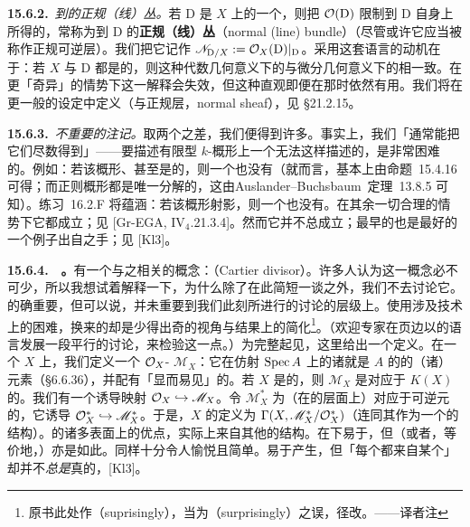 \textbf{15.6.2.}\ \emph{到\trEffectiveCartierDivisor{}的正规（线）丛。}\quad 若 $\mathrm{D}$ 是\trScheme{} $X$ 上的一个\trEffectiveCartierDivisor，则把\trInvertibleSheaf{} $\mathcal{O}(\mathrm{D})$ 限制到 $\mathrm{D}$ 自身上所得的\trRestriction，常称为到 $\mathrm{D}$ 的\textbf{正规（线）丛}（normal (line) bundle）（尽管或许它应当被称作正规可逆层）。我们把它记作 $\mathscr{N}_{\mathrm{D}/X}:=\mathcal{O}_X(\mathrm{D})\vert_{\mathrm{D}}$。采用这套语言的动机在于：若 $X$ 与 $\mathrm{D}$ 都是\trSmooth{}的\trComplex\trVariety，则这种代数几何意义下的\trNormalBundle{}与微分几何意义下的\trNormalBundle{}相一致。在更「奇异」的情势下这一解释会失效，但这种直观即便在那时依然有用。我们将在更一般的设定中定义\trNormalBundle{}（与正规层，normal sheaf），见 \S21.2.15。

\textbf{15.6.3.}\ \emph{不重要的注记。}\quad 取两个\trEffectiveCartierDivisor{}之差，我们便得到许多\trInvertibleSheaf。事实上，我们「通常能把它们尽数得到」——要描述有限型 $k$-概形上一个无法这样描述的\trInvertibleSheaf，是非常困难的。例如：若该概形\trRegular、甚至是\trFactorial{}的，则一个也没有（就\trFactoriality{}而言，基本上由\mbox{命题~15.4.16} 可得；而正则概形都是唯一分解的，这由\mbox{Auslander--Buchsbaum 定理~13.8.5} 可知）。\mbox{练习~16.2.F} 将蕴涵：若该概形射影，则一个也没有。在其余一切合理的情势下它都成立；见 [Gr-EGA, IV$_4$.21.3.4]。然而它并不总成立；最早的也是最好的一个例子出自\trKleiman{}之手；见 [Kl3]。

\textbf{15.6.4.}\ \extrahard\ \textbf{\trCartierDivisor。}\quad 有一个与之相关的概念：\emph{\trCartierDivisor}（Cartier divisor）。许多人认为这一概念必不可少，所以我想试着解释一下，为什么除了在此简短一谈之外，我们不去讨论它。\trCartierDivisor{}的确重要，但可以说，并未重要到我们此刻所进行的讨论的层级上。使用\trCartierDivisor{}涉及技术上的困难，换来的却是少得出奇的视角与结果上的简化\footnote{原书此处作（suprisingly），当为（surprisingly）之误，径改。——译者注}。（欢迎专家在页边以\trCartierDivisor{}的语言发展一段平行的讨论，来检验这一点。）为完整起见，这里给出一个定义。在一个\trScheme{} $X$ 上，我们定义一个 $\mathcal{O}_X$-\trModule{} $\mathscr{M}_X$：它在仿射\trOpenSet{} $\operatorname{Spec} A$ 上的诸\trSection{}就是 $A$ 的\trTotalFractionRing{}的（诸）元素（\S6.6.36），并配有「显而易见」的\trRestrictionMap。若 $X$ 是\trIntegral{}的，则 $\mathscr{M}_X$ 是对应于\trFunctionField{} $K(X)$ 的\trConstantSheaf。我们有一个诱导映射 $\mathcal{O}_X\hookrightarrow\mathscr{M}_X$。令 $\mathscr{M}_X^{*}$ 为（在\trSection{}的层面上）对应于可逆元的\trGroup\trSheaf，它诱导 $\mathcal{O}_X^{*}\hookrightarrow\mathscr{M}_X^{*}$。于是，$X$ 的\textbf{\trCartierDivisor}定义为 $\Gamma(X,\mathscr{M}_X^{*}/\mathcal{O}_X^{*})$（连同其作为一个\trAbelian\trGroup{}的结构）。\trCartierDivisor{}的诸多表面上的优点，实际上来自其他的结构。\trCartierDivisor{}在\trMorphism{}下易于\trPullback，但\trLineBundle（或者，等价地，\trInvertibleSheaf）亦是如此。\trEffectiveCartierDivisor{}同样十分令人愉悦且简单。\trCartierDivisor{}易于产生\trInvertibleSheaf，但「每个\trInvertibleSheaf{}都来自某个\trCartierDivisor」却并不\emph{总是}真的，[Kl3]。

